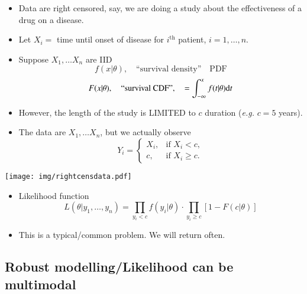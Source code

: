 \documentclass[captions=tableheading]{scrbook}
\begin{document}
\begin{itemize}
\item Data are right censored, say, we are doing a study  about the effectiveness of a drug on a disease.
\item Let \(X_{i} =\) time until onset of disease for \(i^{\mathrm{th}}\) patient, \(i=1,\ldots,n\).
\item Suppose \(X_{1},\ldots X_{n}\) are IID
   \[
   f(x|\theta),\quad \mbox{``survival density''}\quad \mathrm{PDF}
   \]
   \[
   F(x|\theta),\quad \mbox{``survival CDF''},\quad =\int_{-\infty}^{x}f(t|\theta)\mathrm{d} t
   \]
\item However, the length of the study is LIMITED to $c$ duration (\emph{e.g.} $c=5$ years).
\item The data are  \(X_{1},\ldots X_{n}\), but we actually observe
  \[
  Y_{i}=
  \begin{cases}
  X_{i}, & \mbox{if }X_{i}<c,\\
  c, & \mbox{if }X_{i}\geq c.
  \end{cases}
  \]
\end{itemize}

\begin{center}

\texttt{[image: img/rightcensdata.pdf]}

\end{center}


\begin{itemize}
\item Likelihood function
  \[
  L(\theta | y_{1},\ldots,y_{n}) = \prod_{y_{i} < c} f(y_{i}|\theta)\cdot \prod_{y_{i}\geq c}\left[ 1 - F(c|\theta) \right]
  \]
\item This is a typical/common problem.  We will return often.
\end{itemize}
\subsection{Robust modelling/Likelihood can be multimodal}
\label{sec-1_2_2}
\end{document}
